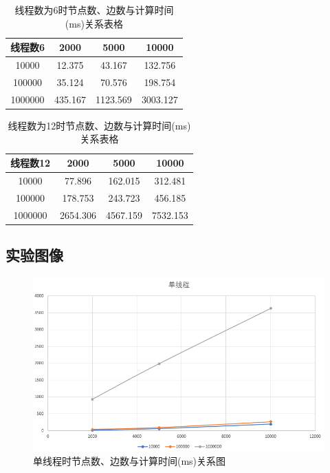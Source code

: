 \documentclass[UTF8]{ctexart}
\begin{document}
\begin{table}[H]
    \centering
    \begin{tabular}{|c|c|c|c|}
        \hline
        线程数6&	2000&	5000&	10000\\
        \hline
        10000&	12.375&	43.167&	132.756\\
        \hline
        100000&	35.124&	70.576&	198.754\\
        \hline
        1000000&	435.167&	1123.569&	3003.127\\
        \hline
    \end{tabular}
    \caption{线程数为6时节点数、边数与计算时间(ms)关系表格}
\end{table}

\begin{table}[H]
    \centering
    \begin{tabular}{|c|c|c|c|}
        \hline
        线程数12&	2000&	5000&	10000\\
        \hline
        10000&	77.896&	162.015&	312.481\\
        \hline
        100000&	178.753&	243.723&	456.185\\
        \hline
        1000000&	2654.306&	4567.159&	7532.153\\
        \hline
    \end{tabular}
    \caption{线程数为12时节点数、边数与计算时间(ms)关系表格}
\end{table}

\subsection{实验图像}

\begin{figure}[H]
    \centering
    \includegraphics[scale=0.55]{thread=1.png}
    \caption{单线程时节点数、边数与计算时间(ms)关系图}
\end{figure}
\end{document}
